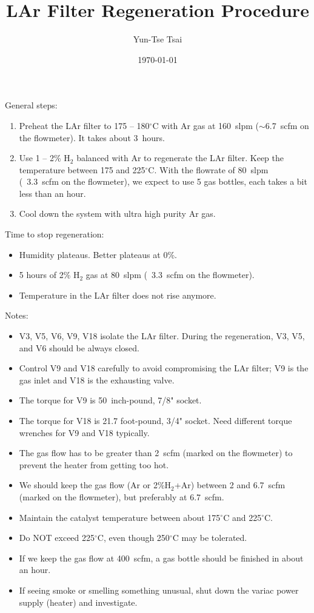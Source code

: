 \documentclass[letterpaper,11pt]{article}
\newcommand{\Hydro}     {H$_2$}
\newcommand{\dC}        {$^\circ$C}
\begin{document}
\title{\textbf{LAr Filter Regeneration Procedure}}
\author{Yun-Tse Tsai}
\date{\today}

\maketitle


General steps:
\begin{enumerate}
\setlength\itemsep{-0.2em}
\item Preheat the LAr filter to 175 -- 180{\dC} with Ar gas at 160~slpm ($\sim$6.7~scfm on the flowmeter).  It takes about 3~hours.
\item Use 1 -- 2\% {\Hydro} balanced with Ar to regenerate the LAr filter.  Keep the temperature between 175 and 225{\dC}.  With the flowrate of 80~slpm (~3.3~scfm on the flowmeter), we expect to use 5 gas bottles, each takes a bit less than an hour.
\item Cool down the system with ultra high purity Ar gas.
\end{enumerate}

Time to stop regeneration:
\begin{itemize}
\setlength\itemsep{-0.2em}
\item Humidity plateaus.  Better plateaus at 0\%.
\item 5 hours of 2\% {\Hydro} gas at 80~slpm (~3.3~scfm on the flowmeter).
\item Temperature in the LAr filter does not rise anymore.
\end{itemize}

Notes:
\begin{itemize}
\setlength\itemsep{-0.2em}
\item V3, V5, V6, V9, V18 isolate the LAr filter.  During the regeneration, V3, V5, and V6 should be always closed.
\item Control V9 and V18 carefully to avoid compromising the LAr filter; V9 is the gas inlet and V18 is the exhausting valve.
\item The torque for V9 is 50~inch-pound, 7/8" socket.
\item The torque for V18 is 21.7 foot-pound, 3/4" socket.  Need different torque wrenches for V9 and V18 typically.
\item The gas flow has to be greater than 2~scfm (marked on the flowmeter) to prevent the heater from getting too hot.
\item We should keep the gas flow (Ar or 2\%{\Hydro}+Ar) between 2 and 6.7~scfm (marked on the flowmeter), but preferably at 6.7~scfm.
\item Maintain the catalyst temperature between about 175{\dC} and
225{\dC}.
\item Do NOT exceed 225{\dC}, even though 250{\dC} may be tolerated.
\item If we keep the gas flow at 400~scfm, a gas bottle should be finished in about an hour.
\item If seeing smoke or smelling something unusual, shut down the variac power supply (heater) and investigate.
\end{itemize}
\end{document}
